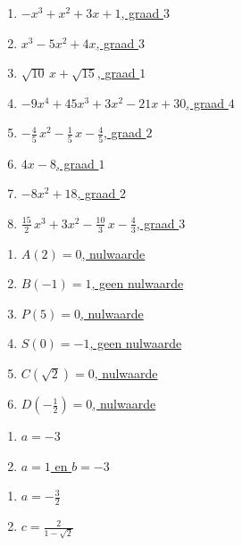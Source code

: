 \documentclass{ximera}
\begin{document}
\begin{Antwoord} \label{antw1.7}
\begin{enumerate}
\item
\hyperlink{oef1.7}{$-x^3+x^2+3x+1$, graad $3$}
\item
\hyperlink{oef1.7}{$x^3-5x^2+4x$, graad $3$}
\item
\hyperlink{oef1.7}{$\sqrt{10}\,x+\sqrt{15}$, graad $1$}
\item
\hyperlink{oef1.7}{$-9x^4+45x^3+3x^2-21x+30$, graad $4$}
\item
\hyperlink{oef1.7}{$-\frac{4}{5}\,x^2-\frac{1}{5}\,x-\frac{4}{5}$, graad $2$}
\item
\hyperlink{oef1.7}{$4x-8$, graad $1$}
\item
\hyperlink{oef1.7}{$-8x^2+18$, graad $2$}
\item
\hyperlink{oef1.7}{$\frac{15}{2}\,x^3 + 3x^2 - \frac{10}{3}\,x-\frac{4}{3}$, graad $3$}
\end{enumerate}
\end{Antwoord}

\begin{Antwoord} \label{antw1.8}
\begin{enumerate}
\item
\hyperlink{oef1.8}{$A(2)=0$, nulwaarde}
\item
\hyperlink{oef1.8}{$B(-1)=1$, geen nulwaarde}
\item
\hyperlink{oef1.8}{$P(5)=0$, nulwaarde}
\item
\hyperlink{oef1.8}{$S(0)=-1$, geen nulwaarde}
\item
\hyperlink{oef1.8}{$C(\sqrt{2})=0$, nulwaarde}
\item
\hyperlink{oef1.8}{$D\left(-\frac{1}{2}\right)=0$, nulwaarde}
\end{enumerate}
\end{Antwoord}

\begin{Antwoord} \label{antw1.9}
\begin{enumerate}
\item
\hyperlink{oef1.9}{$a=-3$}
\item
\hyperlink{oef1.9}{$a = 1$ en $b = -3$}
\end{enumerate}
\end{Antwoord}

\begin{Antwoord} \label{antw1.10}
\begin{enumerate}
\item
\hyperlink{oef1.10}{$a = -\frac{3}{2}$}
\item
\hyperlink{oef1.10}{$c = \frac{2}{1-\sqrt{2}}$}
\end{enumerate}
\end{Antwoord}
\end{document}
